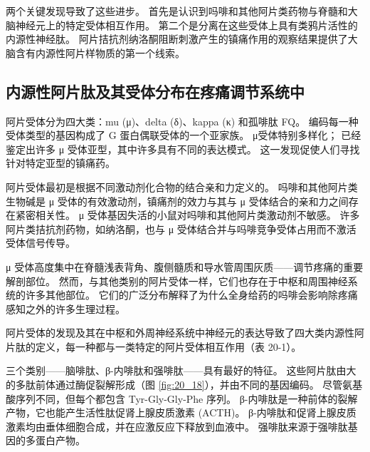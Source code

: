 两个关键发现导致了这些进步。 
首先是认识到吗啡和其他阿片类药物与脊髓和大脑神经元上的特定受体相互作用。 
第二个是分离在这些受体上具有类鸦片活性的内源性神经肽。 
阿片拮抗剂纳洛酮阻断刺激产生的镇痛作用的观察结果提供了大脑含有内源性阿片样物质的第一个线索。


\subsection{内源性阿片肽及其受体分布在疼痛调节系统中}
阿片受体分为四大类：mu (μ)、delta (δ)、kappa (κ) 和孤啡肽 FQ。 
编码每一种受体类型的基因构成了 G 蛋白偶联受体的一个亚家族。 
μ受体特别多样化； 已经鉴定出许多 μ 受体亚型，其中许多具有不同的表达模式。 
这一发现促使人们寻找针对特定亚型的镇痛药。


阿片受体最初是根据不同激动剂化合物的结合亲和力定义的。 
吗啡和其他阿片类生物碱是 μ 受体的有效激动剂，镇痛剂的效力与其与 μ 受体结合的亲和力之间存在紧密相关性。 
μ 受体基因失活的小鼠对吗啡和其他阿片类激动剂不敏感。 
许多阿片类拮抗剂药物，如纳洛酮，也与 μ 受体结合并与吗啡竞争受体占用而不激活受体信号传导。


μ 受体高度集中在脊髓浅表背角、腹侧髓质和导水管周围灰质——调节疼痛的重要解剖部位。 
然而，与其他类别的阿片受体一样，它们也存在于中枢和周围神经系统的许多其他部位。 
它们的广泛分布解释了为什么全身给药的吗啡会影响除疼痛感知之外的许多生理过程。


阿片受体的发现及其在中枢和外周神经系统中神经元的表达导致了四大类内源性阿片肽的定义，每一种都与一类特定的阿片受体相互作用（表 20-1）。


三个类别——脑啡肽、β-内啡肽和强啡肽——具有最好的特征。 
这些阿片肽由大的多肽前体通过酶促裂解形成（图 \ref{fig:20_18}），并由不同的基因编码。 
尽管氨基酸序列不同，但每个都包含 Tyr-Gly-Gly-Phe 序列。 
β-内啡肽是一种前体的裂解产物，它也能产生活性肽促肾上腺皮质激素 (ACTH)。 
β-内啡肽和促肾上腺皮质激素均由垂体细胞合成，并在应激反应下释放到血液中。 
强啡肽来源于强啡肽基因的多蛋白产物。

